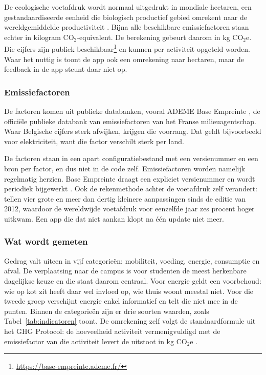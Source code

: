 \documentclass{hogent-article}
\begin{document}
    De ecologische voetafdruk wordt normaal uitgedrukt in mondiale hectaren, een
    gestandaardiseerde eenheid die biologisch productief gebied omrekent naar de
    wereldgemiddelde productiviteit \autocite{Lin2018}. Bijna alle beschikbare
    emissiefactoren staan echter in kilogram CO$_2$-equivalent. De berekening
    gebeurt daarom in kg CO$_2$e. Die cijfers zijn publiek
    beschikbaar\footnote{\url{https://base-empreinte.ademe.fr/}} en kunnen per
    activiteit opgeteld worden. Waar het nuttig is toont de app ook een omrekening
    naar hectaren, maar de feedback in de app steunt daar niet op.
    
    \subsubsection{Emissiefactoren}
    \label{sssec:emissiefactoren}
    
    De factoren komen uit publieke databanken, vooral ADEME Base Empreinte
    \autocite{ADEME2026}, de officiële publieke databank van emissiefactoren van het
    Franse milieuagentschap. Waar Belgische cijfers sterk afwijken, krijgen die
    voorrang. Dat geldt bijvoorbeeld voor elektriciteit, want die factor verschilt
    sterk per land.
    
    De factoren staan in een apart configuratiebestand met een versienummer en een
    bron per factor, en dus niet in de code zelf. Emissiefactoren worden namelijk
    regelmatig herzien. Base Empreinte draagt een expliciet versienummer en wordt
    periodiek bijgewerkt \autocite{ADEME2026}. Ook de rekenmethode achter de
    voetafdruk zelf verandert: \textcite{Lin2018} tellen vier grote en meer dan
    dertig kleinere aanpassingen sinds de editie van 2012, waardoor de wereldwijde
    voetafdruk voor eenzelfde jaar zes procent hoger uitkwam. Een app die dat niet
    aankan klopt na één update niet meer.
    
    \subsubsection{Wat wordt gemeten}
    \label{sssec:watmetenwe}
    
    Gedrag valt uiteen in vijf categorieën: mobiliteit, voeding, energie, consumptie
    en afval. De verplaatsing naar de campus is voor studenten de meest herkenbare
    dagelijkse keuze en die staat daarom centraal. Voor energie geldt een
    voorbehoud: wie op kot zit heeft daar wel invloed op, wie thuis woont meestal
    niet. Voor die tweede groep verschijnt energie enkel informatief en telt die
    niet mee in de punten. Binnen de categorieën zijn er drie soorten waarden, zoals
    Tabel~\ref{tab:indicatoren} toont.
    De omrekening zelf volgt de standaardformule uit het GHG Protocol: de
    hoeveelheid activiteit vermenigvuldigd met de emissiefactor van die activiteit
    levert de uitstoot in kg CO$_2$e \autocite{GHGProtocol2004}.
    
\end{document}
